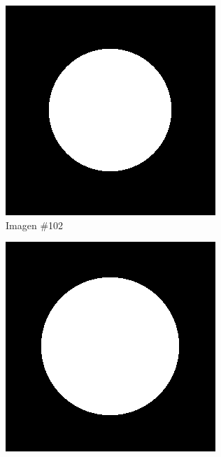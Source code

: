 \begin{figure}
	\begin{subfigure}{0.30\textwidth}
		\centering
		\includegraphics[width=\textwidth]{images/datasets/ImSphRad100/Sphere102.png}
		\caption{Imagen \#102}
		\label{f:implementacion:ImSphRad100:102}
	\end{subfigure}
	\begin{subfigure}{0.30\textwidth}
		\centering
		\includegraphics[width=\textwidth]{images/datasets/ImSphRad100/Sphere166.png}

\end{subfigure}
\end{figure}
